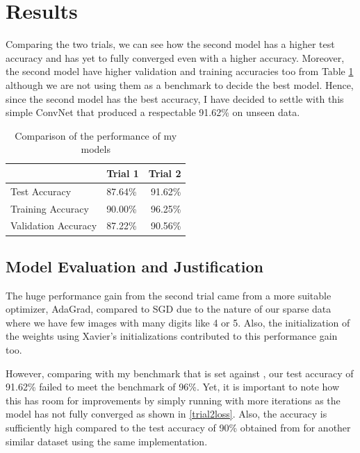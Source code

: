 \documentclass[twoside, column]{article}
\begin{document}
\section{Results}
 
 Comparing the two trials, we can see how the second model has a higher test accuracy and has yet to fully converged even with a higher accuracy. Moreover, the second model have higher validation and training accuracies too from Table \ref{performancecomparison} although we are not using them as a benchmark to decide the best model. Hence, since the second model has the best accuracy, I have decided to settle with this simple ConvNet that produced a respectable 91.62\% on unseen data.
 
 \begin{table}[htp]
\caption{Comparison of the performance of my models}
\begin{center}
\begin{tabular}{llr}

\cmidrule(r){1-3}
& Trial 1 & Trial 2 \\
\midrule
Test Accuracy  & 87.64\% & 91.62\%\\
Training Accuracy & 90.00\% & 96.25\% \\
Validation Accuracy &  87.22\% & 90.56\% \\

\end{tabular}
\end{center}
\label{performancecomparison}
\end{table}
 
\subsection{Model Evaluation and Justification}
The huge performance gain from the second trial came from a more suitable optimizer, AdaGrad, compared to SGD due to the nature of our sparse data where we have few images with many digits like 4 or 5. Also, the initialization of the weights using Xavier's initializations contributed to this performance gain too. 

However, comparing with my benchmark that is set against \cite{Goodfellow:2013aa}, our test accuracy of 91.62\% failed to meet the benchmark of 96\%. Yet, it is important to note how this has room for improvements by simply running with more iterations as the model has not fully converged as shown in \ref{trial2loss}. Also, the accuracy is sufficiently high compared to the test accuracy of 90\% obtained from \cite{Goodfellow:2013aa} for another similar dataset using the same implementation.
\end{document}
